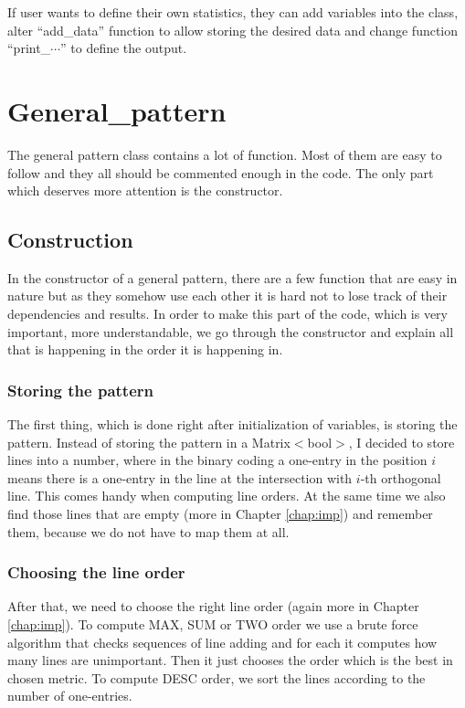If user wants to define their own statistics, they can add variables into the class, alter ``add\_data'' function to allow storing the desired data and change function ``print\_$\cdots$'' to define the output.

\section{General\_pattern}
The general pattern class contains a lot of function. Most of them are easy to follow and they all should be commented enough in the code. The only part which deserves more attention is the constructor.

\subsection{Construction}
In the constructor of a general pattern, there are a few function that are easy in nature but as they somehow use each other it is hard not to lose track of their dependencies and results. In order to make this part of the code, which is very important, more understandable, we go through the constructor and explain all that is happening in the order it is happening in.

\subsubsection{Storing the pattern}
The first thing, which is done right after initialization of variables, is storing the pattern. Instead of storing the pattern in a Matrix$<$bool$>$, I decided to store lines into a number, where in the binary coding a one-entry in the position $i$ means there is a one-entry in the line at the intersection with $i$-th orthogonal line. This comes handy when computing line orders. At the same time we also find those lines that are empty (more in Chapter \ref{chap:imp}) and remember them, because we do not have to map them at all.

\subsubsection{Choosing the line order}
After that, we need to choose the right line order (again more in Chapter \ref{chap:imp}). To compute MAX, SUM or TWO order we use a brute force algorithm that checks sequences of line adding and for each it computes how many lines are unimportant. Then it just chooses the order which is the best in chosen metric. To compute DESC order, we sort the lines according to the number of one-entries.

